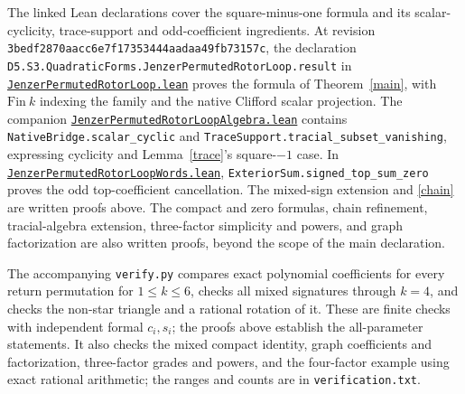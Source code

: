 \documentclass[11pt]{article}
\begin{document}
The linked Lean declarations cover the square-minus-one formula and its
scalar-cyclicity, trace-support and odd-coefficient ingredients.
At revision \nolinkurl{3bedf2870aacc6e7f17353444aadaa49fb73157c}, the declaration
\nolinkurl{D5.S3.QuadraticForms.JenzerPermutedRotorLoop.result} in
\href{https://github.com/the-omega-institute/trureturing/blob/3bedf2870aacc6e7f17353444aadaa49fb73157c/D5/S3/QuadraticForms/JenzerPermutedRotorLoop.lean}{\nolinkurl{JenzerPermutedRotorLoop.lean}}
proves the formula of Theorem~\ref{main}, with $\mathrm{Fin}\ k$ indexing
the family and the native Clifford scalar projection.
The companion
\href{https://github.com/the-omega-institute/trureturing/blob/3bedf2870aacc6e7f17353444aadaa49fb73157c/D5/S3/QuadraticForms/JenzerPermutedRotorLoopAlgebra.lean}{\nolinkurl{JenzerPermutedRotorLoopAlgebra.lean}}
contains \nolinkurl{NativeBridge.scalar_cyclic} and
\nolinkurl{TraceSupport.tracial_subset_vanishing}, expressing cyclicity
and Lemma~\ref{trace}'s square-$-1$ case. In
\href{https://github.com/the-omega-institute/trureturing/blob/3bedf2870aacc6e7f17353444aadaa49fb73157c/D5/S3/QuadraticForms/JenzerPermutedRotorLoopWords.lean}{\nolinkurl{JenzerPermutedRotorLoopWords.lean}},
\nolinkurl{ExteriorSum.signed_top_sum_zero} proves the odd top-coefficient
cancellation. The mixed-sign extension and \eqref{chain} are written
proofs above. The compact and zero formulas, chain refinement,
tracial-algebra extension, three-factor simplicity and powers, and graph factorization are also
written proofs, beyond the scope of the main declaration.

The accompanying \texttt{verify.py} compares exact polynomial coefficients
for every return permutation for $1\leq k\leq6$, checks all mixed
signatures through $k=4$, and checks the non-star triangle and a rational
rotation of it. These are finite checks with independent formal $c_i,s_i$;
the proofs above establish the all-parameter statements. It also checks
the mixed compact identity, graph coefficients and factorization,
three-factor grades and powers, and the four-factor example using exact
rational arithmetic; the ranges and counts are in \texttt{verification.txt}.
\end{document}
